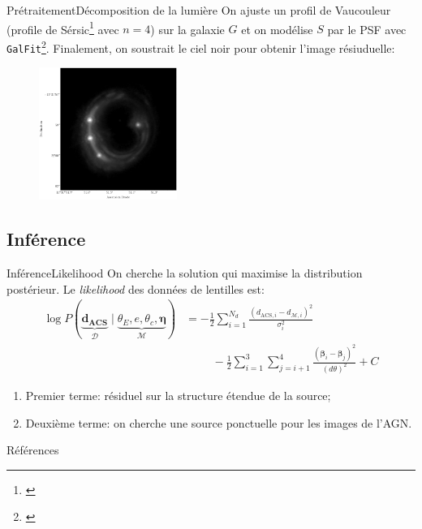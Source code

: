 \documentclass{beamer}
\begin{document}
\begin{frame}{Prétraitement}{Décomposition de la lumière}
        On ajuste un profil de 
        Vaucouleur (profile de Sérsic\footnote{\citet{Sersic1963}} avec $n=4$)
        sur la galaxie $G$ et on 
        modélise $S$ par le PSF avec \texttt{GalFit}\footnote{\citet{Peng2002}}. Finalement, 
        on soustrait le ciel noir pour obtenir l'image résiuduelle:
        \begin{figure}[H]
                \centering
                \includegraphics[width=0.4\textwidth]{residual}
        \end{figure}
        
\end{frame}


\subsection{Inférence}

\begin{frame}{Inférence}{Likelihood}
        On cherche la solution qui maximise la distribution postérieur. Le 
        \textit{likelihood} des données de lentilles est:
        \begin{align}\label{eq:Likelihood} 
                \log P(\underbrace{\mathbf{d_{\text{ACS}}}}_{\mathcal{D}}\mid 
                \underbrace{\theta_E, e, \theta_c, \boldsymbol{ \eta}}_{\mathcal{M}} )  
        &= -\frac{1}{2}\sum_{i=1}^{N_d} \frac{(d_{\text{ACS},i} 
        - d_{\mathcal{M}, i})^2}{\sigma^2_i}
        \\\nonumber
        &\hspace{1cm}-\frac{1}{2}\sum_{i=1}^{3}\sum_{j=i+1}^{4} \frac{
        (\boldsymbol{\beta}_i - \boldsymbol{\beta}_j  )^2}{(d\theta)^2} + C 
        \end{align} 
\begin{enumerate}
        \item Premier terme: résiduel sur la structure étendue de la source;
        \item Deuxième terme: on cherche une source ponctuelle pour les images de l'AGN. 
\end{enumerate}
\end{frame}


\begin{frame}[allowframebreaks]{Références}
        
        
\end{frame}
\end{document}
